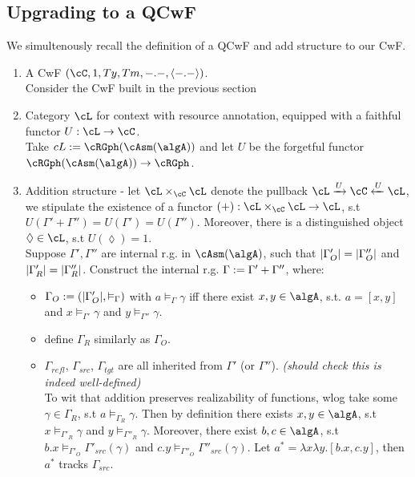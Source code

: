 \documentclass[12pt,a4paper]{article}
\def\src{_{src}}\alwaysmath{src}
\def\rfl{_{refl}}\alwaysmath{rfl}
\def\tgt{_{tgt}}\alwaysmath{tgt}
\renewcommand{\O}{_{O}}\alwaysmath{O}
\def\R{_{R}}\alwaysmath{R}
\begin{document}
\subsection*{Upgrading to a QCwF}
We simultenously recall the definition of a QCwF and add structure to our CwF.
\begin{enumerate}[noitemsep]
  \item A CwF $(\cC, 1, Ty, Tm, -.-, \langle-.-\rangle)$.\\
  Consider the CwF built in the previous section
  
  \item Category $\cL$ for context with resource annotation, equipped with a faithful functor $U: \cL \to \cC$.\\
  Take $cL := \cRGph(\cAsm(\algA))$ and let $U$ be the forgetful functor $\cRGph(\cAsm(\algA)) \to \cRGph$.
  
  \item Addition structure - let $\cL \times_\cC \cL$ denote the pullback $\cL \xrightarrow{U} \cC \xleftarrow{U} \cL$, we stipulate the existence of a functor $(+): \cL \times_\cC \cL \to \cL$, s.t $U(\Gamma' + \Gamma'')=U(\Gamma')=U(\Gamma'')$. Moreover, there is a distinguished object $\lozenge \in \cL$, s.t $U(\lozenge) = 1$.\\
  Suppose $\Gamma', \Gamma''$ are internal r.g. in $\cAsm(\algA)$, such that $\carr{\Gamma'\O}=\carr{\Gamma''\O}$ and $\carr{\Gamma'\R}=\carr{\Gamma''\R}$. Construct the internal r.g. $\Gamma := \Gamma' + \Gamma''$, where:
  \begin{itemize}[noitemsep]
    \item $\Gamma\O \define (\carr{\Gamma'\O}, \vDash_\Gamma)$ with $ a \vDash_\Gamma \gamma$ iff there exist $x,y \in \algA$, s.t. $a = [x,y]$ and $x \vDash_{\Gamma'} \gamma$ and $ y \vDash_{\Gamma''} \gamma$.
    \item define $\Gamma\R$ similarly as $\Gamma\O$.
    \item $\Gamma\rfl$, $\Gamma\src$, $\Gamma\tgt$ are all inherited from $\Gamma'$ (or $\Gamma''$). \textit{(should check this is indeed well-defined)}\\
    To wit that addition preserves realizability of functions, wlog take some $\gamma \in \Gamma\R$, s.t $ a \vDash_{\Gamma\R} \gamma$. Then by definition there exists $x, y\in \algA$, s.t $ x \vDash_{{\Gamma'}\R} \gamma$ and $y \vDash_{{\Gamma''}\R} \gamma$. Moreover, there exist
    $b, c \in \algA$, s.t $b. x  \vDash_{{\Gamma'}\O} \Gamma'\src(\gamma)$ and $c. y \vDash_{{\Gamma''}\O} \Gamma''\src(\gamma)$. Let $a^* = \lambda x \lambda y. [b.x, c.y]$, then $a^*$ tracks $\Gamma\src$.
    

\end{itemize}
\end{enumerate}
\end{document}
